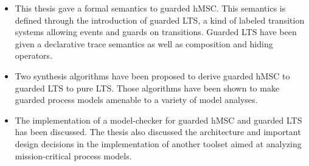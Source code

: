 \begin{itemize}
\item This thesis gave a formal semantics to guarded hMSC. This semantics is defined through the introduction of guarded LTS, a kind of labeled transition systems allowing events and guards on transitions. Guarded LTS have been given a declarative trace semantics as well as composition and hiding operators.
\item Two synthesis algorithms have been proposed to derive guarded hMSC to guarded LTS to pure LTS. Those algorithms have been shown to make guarded process models amenable to a variety of model analyses.
\item The implementation of a model-checker for guarded hMSC and guarded LTS has been discussed. The thesis also discussed the architecture and important design decisions in the implementation of another toolset aimed at analyzing mission-critical process models.
\end{itemize}


